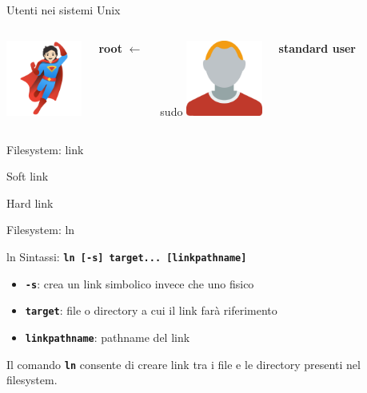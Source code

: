 \documentclass{beamer}
\begin{document}
    \begin{frame}{Utenti nei sistemi Unix}
        \begin{columns}[t, onlytextwidth]
                \centering
                \includegraphics[height=2.5cm, keepaspectratio]{images/root.pdf}

                \large \textbf{root}
                \centering
                \Huge $\longleftarrow$

                \large sudo
                \centering
                \includegraphics[height=2.5cm, keepaspectratio]{images/user2.pdf}

                \large \textbf{standard user}
        \end{columns}
    \end{frame}

    \begin{frame}{Filesystem: link}
        \begin{block}{Soft link}
            \small
        \end{block}

        \begin{block}{Hard link}
            \small
        \end{block}
    \end{frame}

    \begin{frame}{Filesystem: ln}
        \begin{block}{ln}
            \small
            Sintassi: \texttt{\textbf{ln [-s] target... [linkpathname]}}

            \begin{itemize}
                \item \texttt{\textbf{-s}}: crea un link simbolico invece che uno fisico
                \item \texttt{\textbf{target}}: file o directory a cui il link farà riferimento
                \item \texttt{\textbf{linkpathname}}: pathname del link
            \end{itemize}

            Il comando \texttt{\textbf{ln}} consente di creare link tra i file e le directory presenti nel filesystem.
        \end{block}
    \end{frame}
\end{document}
